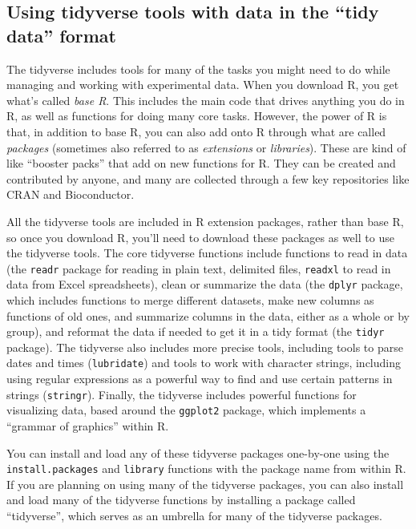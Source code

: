 \documentclass[]{tufte-book}
\begin{document}
\hypertarget{using-tidyverse-tools-with-data-in-the-tidy-data-format}{%
\subsection{Using tidyverse tools with data in the ``tidy data'' format}\label{using-tidyverse-tools-with-data-in-the-tidy-data-format}}

The tidyverse includes tools for many of the tasks you might need to
do while managing and working with experimental data. When you download
R, you get what's called \emph{base R}. This includes the main code that drives
anything you do in R, as well as functions for doing many core tasks.
However, the power of R is that, in addition to base R, you can also add
onto R through what are called \emph{packages} (sometimes also referred to
as \emph{extensions} or \emph{libraries}). These are kind of like ``booster packs''
that add on new functions for R. They can be created and contributed
by anyone, and many are collected through a few key repositories like
CRAN and Bioconductor.

All the tidyverse tools are included in R extension packages, rather than base
R, so once you download R, you'll need to download these packages as well to use
the tidyverse tools. The core tidyverse functions include functions to read in
data (the \texttt{readr} package for reading in plain text, delimited files, \texttt{readxl}
to read in data from Excel spreadsheets), clean or summarize the data (the
\texttt{dplyr} package, which includes functions to merge different datasets, make
new columns as functions of old ones, and summarize columns in the data, either
as a whole or by group), and reformat the data if needed to get it in a tidy
format (the \texttt{tidyr} package). The tidyverse also includes more precise tools,
including tools to parse dates and times (\texttt{lubridate}) and tools to work with
character strings, including using regular expressions as a powerful way to find
and use certain patterns in strings (\texttt{stringr}). Finally, the tidyverse
includes powerful functions for visualizing data, based around the \texttt{ggplot2}
package, which implements a ``grammar of graphics'' within R.

You can install and load any of these tidyverse packages one-by-one using the
\texttt{install.packages} and \texttt{library} functions with the package name from within R.
If you are planning on using many of the tidyverse packages, you can also
install and load many of the tidyverse functions by installing a package called
``tidyverse'', which serves as an umbrella for many of the tidyverse packages.
\end{document}
